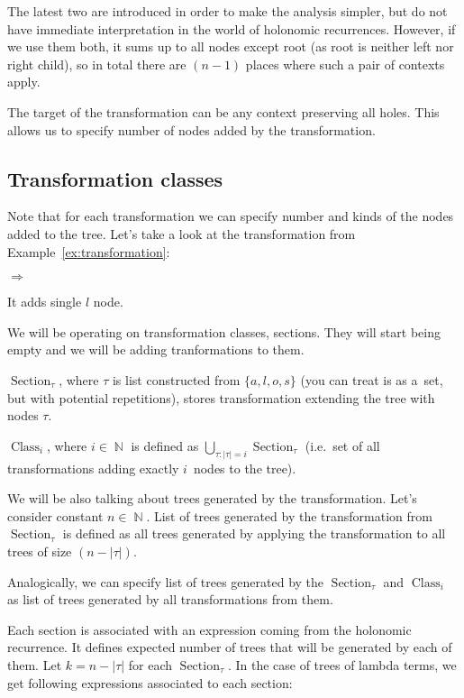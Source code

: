 \documentclass[final]{article}
\theoremstyle{definition}
\theoremstyle{definition}
\theoremstyle{remark}
\DeclareMathOperator{\N}{\mathbb{N}}
\DeclareMathOperator{\tClass}{\text{Class}}
\DeclareMathOperator{\tSection}{\text{Section}}
\newcommand{\includeinlinescaledsvg}[3]{\begin{minipage}{#1\textwidth}\begin{center}\end{center}\end{minipage}}
\begin{document}
The latest two are introduced in order to make the analysis simpler, but do not have immediate interpretation in the world of holonomic recurrences. However, if we use them both, it sums up to all nodes except root (as root is neither left nor right child), so in total there are \((n - 1)\) places where such a pair of contexts apply.

The target of the transformation can be any context preserving all holes. This allows us to specify number of nodes added by the transformation.

\subsection{Transformation classes}%
\label{sub:transformation_classes}

Note that for each transformation we can specify number and kinds of the nodes added to the tree. Let's take a look at the transformation from Example~\ref{ex:transformation}:
\begin{center}
    \includeinlinescaledsvg{.4}{.7}{lambda__contexts__def_001}%
    \(\Rightarrow\)
    \includeinlinescaledsvg{.4}{.7}{lambda__contexts__def_002_with_l}%
\end{center}
It adds single \(l\) node.

We will be operating on transformation classes, sections. They will start being empty and we will be adding tranformations to them.

\(\tSection_\tau\), where \(\tau\) is list constructed from \(\{a, l, o, s\}\) (you can treat is as a~set, but with potential repetitions), stores transformation extending the tree with nodes \(\tau\).

\(\tClass_i\), where \(i \in \N\) is defined as \(\bigcup_{\tau : |\tau| = i} \tSection_\tau\) (i.e.~set of all transformations adding exactly \(i\)~nodes to the tree).

We will be also talking about trees generated by the transformation. Let's consider constant \(n \in \N\). List of trees generated by the transformation from \(\tSection_\tau\) is defined as all trees generated by applying the transformation to all trees of size \((n - |\tau|)\).

Analogically, we can specify list of trees generated by the \(\tSection_\tau\) and \(\tClass_i\) as list of trees generated by all transformations from them.

Each section is associated with an expression coming from the holonomic recurrence. It defines expected number of trees that will be generated by each of them. Let \(k = n - |\tau|\) for each \(\tSection_\tau\). In the case of trees of lambda terms, we get following expressions associated to each section:
\end{document}
